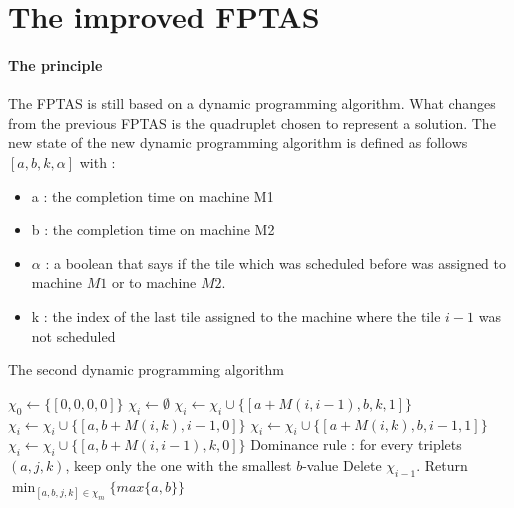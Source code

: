 \documentclass[a4paper, 11pt]{report}
\begin{document}
\newpage

\section{The improved FPTAS}

\paragraph{The principle}
The FPTAS is still based on a dynamic programming algorithm. What changes from the previous FPTAS is the quadruplet chosen to represent a solution. The new state of the new dynamic programming algorithm is defined as follows $[a, b, k, \alpha]$ with :
\begin{itemize}
	\item a : the completion time on machine M1
	\item b : the completion time on machine M2
	\item $\alpha$ : a boolean that says if the tile which was scheduled before was assigned to machine $M1$ or to machine $M2$.
	\item k : the index of the last tile assigned to the machine where the tile $i - 1$ was not scheduled
\end{itemize}

\begin{algorithm}[H]
	\caption {The second dynamic programming algorithm}
	\begin{algorithmic}
		\State $\chi_0 \leftarrow \{[0, 0, 0, 0]\}$ 
		\State $\chi_i \leftarrow \emptyset$
		 
		\State $\chi_i \leftarrow \chi_i \cup \{ [a + M(i, i-1), b, k, 1] \}$ 
		\State $\chi_i \leftarrow \chi_i \cup \{ [a, b + M(i, k), i-1, 0] \}$ 
		\Else
		\State $\chi_i \leftarrow \chi_i \cup \{ [a + M(i, k), b, i-1, 1] \}$ 
		\State $\chi_i \leftarrow \chi_i \cup \{ [a, b + M(i, i-1), k, 0] \}$ 
		\EndIf
		\EndFor
		\State Dominance rule : for every triplets $(a, j, k)$, keep only the one with the smallest $b$-value
		\State Delete $\chi_{i-1}$.
		\EndFor
		\State Return $ \min_{ [a, b, j, k] \in \chi_m } \{ max\{a, b\} \}$
	\end{algorithmic}
	\label{DP_algo_2}
\end{algorithm}
\end{document}
